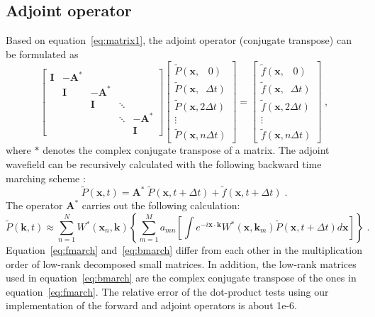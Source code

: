\subsection{Adjoint operator}

Based on equation~\ref{eq:matrix1}, the adjoint operator (conjugate transpose) can be formulated as
\begin{equation}
	\label{eq:matrix2}
	\left[ \begin{array}{ccccc}
			\mathbf{I}  & -\mathbf{A}^* &  &  & \\
						& \mathbf{I} & -\mathbf{A}^* & &\\
						& & \mathbf{I} & \ddots & \\
						& & & \ddots & -\mathbf{A}^* \\
			   & & & & \mathbf{I}
	\end{array} \right]
	\left[ \begin{array}{c}
			\widetilde{P}(\mathbf{x}, \;\;\; 0) \\
			\widetilde{P}(\mathbf{x}, \;\; \Delta t) \\
			\widetilde{P}(\mathbf{x}, 2\Delta t) \\
			\vdots \\
			\widetilde{P}(\mathbf{x}, n\Delta t)
	\end{array} \right]
	=
	\left[ \begin{array}{c}
			\widetilde{f}(\mathbf{x}, \; \; \; 0) \\
			\widetilde{f}(\mathbf{x}, \; \; \Delta t) \\
			\widetilde{f}(\mathbf{x}, 2\Delta t) \\
			\vdots \\
			\widetilde{f}(\mathbf{x}, n\Delta t)
	\end{array} \right] \; ,
\end{equation}
where $*$ denotes the complex conjugate transpose of a matrix.
The adjoint wavefield can be recursively calculated with the following backward time marching scheme \cite[]{sun16b} :
\begin{equation}
	\label{eq:compact2}
	\widetilde{P}(\mathbf{x},t) = \mathbf{A}^* \; \widetilde{P}(\mathbf{x},t + \Delta t) + \widetilde{f}(\mathbf{x},t+\Delta t)\; .
\end{equation}
The operator $\mathbf{A}^*$ carries out the following calculation:
\begin{equation}
	\label{eq:bmarch}
	\widetilde{P}(\mathbf{k},t)  \approx  \sum_{n=1}^{N}  W^*(\mathbf{x}_n,\mathbf{k}) \left\{\sum_{m=1}^{M}a_{mn} \left[ \int e^{-i\mathbf{x} \cdot \mathbf{k}} W^*(\mathbf{x},\mathbf{k}_m) \widetilde{P}(\mathbf{x},t+\Delta t) d\mathbf{x} \right]\right\} \; .
\end{equation}
Equation~\ref{eq:fmarch} and~\ref{eq:bmarch} differ from each other in the multiplication order of low-rank decomposed small matrices.
In addition, the low-rank matrices used in equation~\ref{eq:bmarch} are the complex conjugate transpose of the ones in equation~\ref{eq:fmarch}.
The relative error of the dot-product tests using our implementation of the forward and adjoint operators is about 1e-6.

